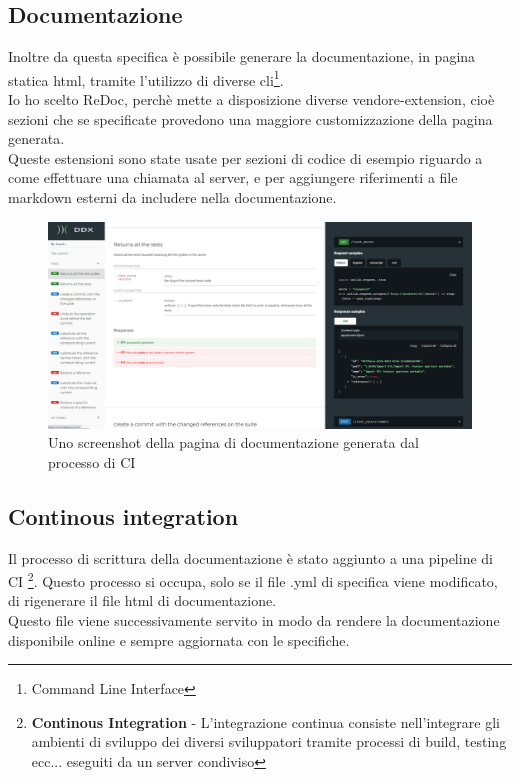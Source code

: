             \subsection{Documentazione\label{apidoc}}
                Inoltre da questa specifica è possibile generare la documentazione, in pagina statica html,
                tramite l'utilizzo di diverse cli\footnote{Command Line Interface}.\\
                Io ho scelto ReDoc, perchè mette a disposizione diverse vendore-extension, cioè sezioni che
                se specificate provedono una maggiore customizzazione della pagina generata.\\
                Queste estensioni sono state usate per sezioni di codice di esempio riguardo a come effettuare una chiamata al server, e per aggiungere riferimenti a file markdown esterni da includere nella documentazione.\\
                
                \begin{figure}[h]
                    \includegraphics[width=\textwidth]{images/documentation.png}
                    \caption{Uno screenshot della pagina di documentazione generata dal processo di CI}
                \end{figure}

            \subsection{Continous integration}
                Il processo di scrittura della documentazione è stato aggiunto a una pipeline di CI
                \footnote{\textbf{Continous Integration} - L'integrazione continua consiste nell'integrare gli ambienti di sviluppo dei diversi sviluppatori tramite processi di build, testing ecc... eseguiti da un server condiviso}.
                Questo processo si occupa, solo se il file .yml di specifica viene modificato, di 
                rigenerare il file html di documentazione.\\
                Questo file viene successivamente servito in modo da rendere la documentazione 
                disponibile online e sempre aggiornata con le specifiche.

